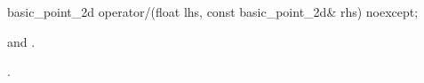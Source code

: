 %
\begin{itemdecl}
basic_point_2d operator/(float lhs, const basic_point_2d& rhs) noexcept;
\end{itemdecl}
\begin{itemdescr}
\pnum
\requires
{} and .

\pnum
\returns
{}.
\end{itemdescr}
